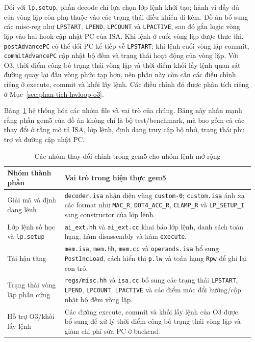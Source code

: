 \documentclass[../DoAn.tex]{subfiles}
\begin{document}
Đối với \texttt{lp.setup}, phần decode chỉ lựa chọn lớp lệnh khởi tạo; hành vi đầy đủ của vòng lặp còn phụ thuộc vào các trạng thái điều khiển đi kèm. Đồ án bổ sung các misc-reg như \texttt{LPSTART}, \texttt{LPEND}, \texttt{LPCOUNT} và \texttt{LPACTIVE}, sau đó gắn logic vòng lặp vào hai hook cập nhật PC của ISA. Khi lệnh ở cuối vòng lặp được thực thi, \texttt{postAdvancePC} có thể đổi PC kế tiếp về \texttt{LPSTART}; khi lệnh cuối vòng lặp commit, \texttt{commitAdvancePC} cập nhật bộ đếm và trạng thái hoạt động của vòng lặp. Với O3, thời điểm công bố trạng thái vòng lặp và thời điểm khối lấy lệnh quan sát đường quay lại đầu vòng phức tạp hơn, nên phần này còn cần các điều chỉnh riêng ở execute, commit và khối lấy lệnh. Các điều chỉnh đó được phân tích riêng ở Mục~\ref{sec:phan-tich-hwloop-o3}.

Bảng~\ref{tab:gem5-ai-ext-components} hệ thống hóa các nhóm file và vai trò của chúng. Bảng này nhấn mạnh rằng phần gem5 của đồ án không chỉ là bộ test/benchmark, mà bao gồm cả các thay đổi ở tầng mô tả ISA, lớp lệnh, định dạng truy cập bộ nhớ, trạng thái phụ trợ và đường cập nhật PC.

\begin{table}[H]
    \centering
    \small
    \renewcommand{\arraystretch}{1.16}
    \begin{tabular}{|>{\raggedright\arraybackslash}p{3.45cm}|>{\raggedright\arraybackslash}p{9.45cm}|}
        \hline
        \textbf{Nhóm thành phần} & \textbf{Vai trò trong hiện thực gem5} \\
        \hline
        Giải mã và định dạng lệnh & \texttt{decoder.isa} nhận diện vùng \texttt{custom-0}; \texttt{custom.isa} ánh xạ các format như \texttt{MAC\_R}, \texttt{DOT4\_ACC\_R}, \texttt{CLAMP\_R} và \texttt{LP\_SETUP\_I} sang constructor của lớp lệnh. \\
        \hline
        Lớp lệnh số học và \texttt{lp.setup} & \texttt{ai\_ext.hh} và \texttt{ai\_ext.cc} khai báo lớp lệnh, danh sách toán hạng, hàm disassembly và hàm \texttt{execute}. \\
        \hline
        Tải hậu tăng & \texttt{mem.isa}, \texttt{mem.hh}, \texttt{mem.cc} và \texttt{operands.isa} bổ sung \texttt{PostIncLoad}, cách hiển thị \texttt{p.lw} và toán hạng \texttt{Rpw} để ghi lại con trỏ. \\
        \hline
        Trạng thái vòng lặp phần cứng & \texttt{regs/misc.hh} và \texttt{isa.cc} bổ sung các trạng thái \texttt{LPSTART}, \texttt{LPEND}, \texttt{LPCOUNT}, \texttt{LPACTIVE} và các điểm móc đổi hướng/cập nhật bộ đếm vòng lặp. \\
        \hline
        Hỗ trợ O3/khối lấy lệnh & Các đường execute, commit và khối lấy lệnh của O3 được bổ sung để xử lý thời điểm công bố trạng thái vòng lặp và giảm chi phí sửa PC ở backend. \\
        \hline
    \end{tabular}
    \caption{Các nhóm thay đổi chính trong gem5 cho nhóm lệnh mở rộng}
    \label{tab:gem5-ai-ext-components}
\end{table}
\end{document}
